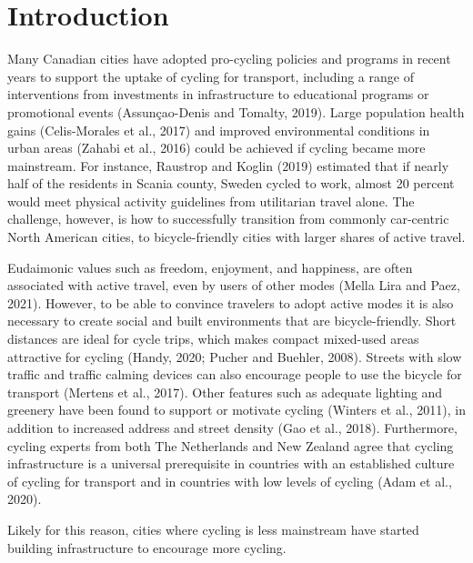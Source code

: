 \documentclass[]{elsarticle} %
\begin{document}
\newpage

\hypertarget{sec:introduction}{%
\section{Introduction}\label{sec:introduction}}

Many Canadian cities have adopted pro-cycling policies and programs in
recent years to support the uptake of cycling for transport, including a
range of interventions from investments in infrastructure to educational
programs or promotional events (Assunçao-Denis and Tomalty, 2019). Large
population health gains (Celis-Morales et al., 2017) and improved
environmental conditions in urban areas (Zahabi et al., 2016) could be
achieved if cycling became more mainstream. For instance, Raustrop and
Koglin (2019) estimated that if nearly half of the residents in Scania
county, Sweden cycled to work, almost 20 percent would meet physical
activity guidelines from utilitarian travel alone. The challenge,
however, is how to successfully transition from commonly car-centric
North American cities, to bicycle-friendly cities with larger shares of
active travel.

Eudaimonic values such as freedom, enjoyment, and happiness, are often
associated with active travel, even by users of other modes (Mella Lira
and Paez, 2021). However, to be able to convince travelers to adopt
active modes it is also necessary to create social and built
environments that are bicycle-friendly. Short distances are ideal for
cycle trips, which makes compact mixed-used areas attractive for cycling
(Handy, 2020; Pucher and Buehler, 2008). Streets with slow traffic and
traffic calming devices can also encourage people to use the bicycle for
transport (Mertens et al., 2017). Other features such as adequate
lighting and greenery have been found to support or motivate cycling
(Winters et al., 2011), in addition to increased address and street
density (Gao et al., 2018). Furthermore, cycling experts from both The
Netherlands and New Zealand agree that cycling infrastructure is a
universal prerequisite in countries with an established culture of
cycling for transport and in countries with low levels of cycling (Adam
et al., 2020).

Likely for this reason, cities where cycling is less mainstream have
started building infrastructure to encourage more cycling.
\end{document}
